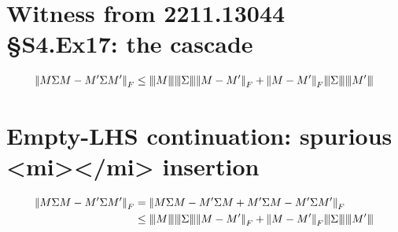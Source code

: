 \documentclass{article}
\newcommand{\vertiii}[1]{{\left\vert\kern-0.25ex\left\vert\kern-0.25ex\left\vert #1 \right\vert\kern-0.25ex\right\vert\kern-0.25ex\right\vert}}  %
\newcommand{\vertif}[1]{{\left\vert\kern-0.25ex\left\vert #1 \right\vert\kern-0.25ex\right\vert}_F}                                %
\begin{document}
\section{Witness from 2211.13044 §S4.Ex17: the cascade}
%
\[
  \vertif{M\Sigma M - M'\Sigma M'}
    \leq \vertiii{M}\vertiii{\Sigma}\vertif{M - M'}
       + \vertif{M - M'}\vertiii{\Sigma}\vertiii{M'}
\]

\section{Empty-LHS continuation: spurious <mi></mi> insertion}
%
\begin{align*}
  \vertif{M\Sigma M - M'\Sigma M'}
    & = \vertif{M\Sigma M - M'\Sigma M + M'\Sigma M - M'\Sigma M'} \\
    & \leq \vertiii{M}\vertiii{\Sigma}\vertif{M - M'}
         + \vertif{M - M'}\vertiii{\Sigma}\vertiii{M'}
\end{align*}
\end{document}
